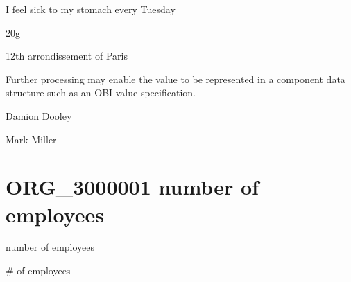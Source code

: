 \documentclass[letterpaper,10pt,english]{sphinxmanual}
\begin{document}
\begin{sphinxShadowBox}

\sphinxAtStartPar
I feel sick to my stomach every Tuesday

\sphinxAtStartPar
20g

\sphinxAtStartPar
12th arrondissement of Paris
\end{sphinxShadowBox}

\begin{sphinxShadowBox}

\sphinxAtStartPar
Further processing may enable the value to be represented in a component data structure such as an OBI value specification.
\end{sphinxShadowBox}

\begin{sphinxShadowBox}

\sphinxAtStartPar
{}
\end{sphinxShadowBox}

\begin{sphinxShadowBox}

\sphinxAtStartPar
Damion Dooley

\sphinxAtStartPar
Mark Miller
\end{sphinxShadowBox}
\begin{quote}

\ignorespaces \end{quote}


\section{ORG\_3000001 \sphinxhyphen{} number of employees}
\label{\detokenize{doc-ORG_3000001:org-3000001-number-of-employees}}\label{\detokenize{doc-ORG_3000001:index-0}}\label{\detokenize{doc-ORG_3000001::doc}}
\begin{sphinxShadowBox}

\sphinxAtStartPar
number of employees
\end{sphinxShadowBox}

\begin{sphinxShadowBox}

\sphinxAtStartPar
\# of employees
\end{sphinxShadowBox}
\end{document}
